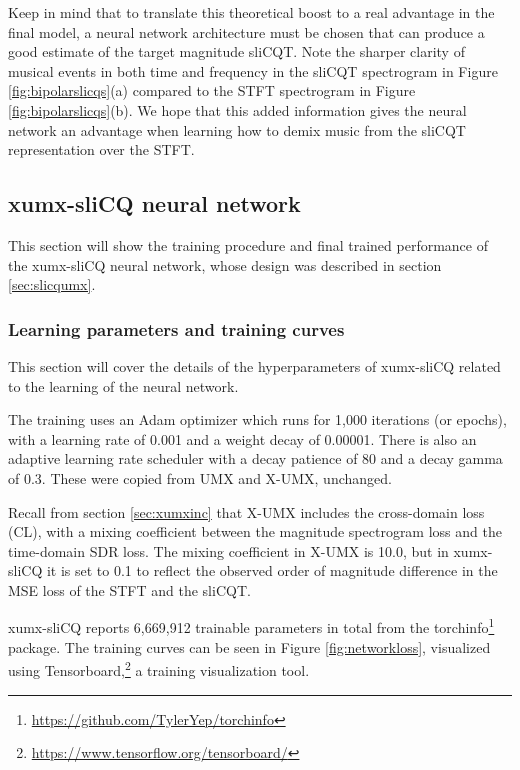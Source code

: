 \documentclass[report.tex]{subfiles}
\begin{document}
Keep in mind that to translate this theoretical boost to a real advantage in the final model, a neural network architecture must be chosen that can produce a good estimate of the target magnitude sliCQT. Note the sharper clarity of musical events in both time and frequency in the sliCQT spectrogram in Figure \ref{fig:bipolarslicqs}(a) compared to the STFT spectrogram in Figure \ref{fig:bipolarslicqs}(b). We hope that this added information gives the neural network an advantage when learning how to demix music from the sliCQT representation over the STFT.

\newpagefill

\subsection{xumx-sliCQ neural network}

This section will show the training procedure and final trained performance of the xumx-sliCQ neural network, whose design was described in section \ref{sec:slicqumx}.

\subsubsection{Learning parameters and training curves}

This section will cover the details of the hyperparameters of xumx-sliCQ related to the learning of the neural network.

The training uses an Adam optimizer which runs for 1,000 iterations (or epochs), with a learning rate of 0.001 and a weight decay of 0.00001. There is also an adaptive learning rate scheduler with a decay patience of 80 and a decay gamma of 0.3. These were copied from UMX and X-UMX, unchanged.

Recall from section \ref{sec:xumxinc} that X-UMX includes the cross-domain loss (CL), with a mixing coefficient between the magnitude spectrogram loss and the time-domain SDR loss. The mixing coefficient in X-UMX is 10.0, but in xumx-sliCQ it is set to 0.1 to reflect the observed order of magnitude difference in the MSE loss of the STFT and the sliCQT.

xumx-sliCQ reports 6,669,912 trainable parameters in total from the torchinfo\footnote{\url{https://github.com/TylerYep/torchinfo}} package. The training curves can be seen in Figure \ref{fig:networkloss}, visualized using Tensorboard,\footnote{\url{https://www.tensorflow.org/tensorboard/}} a training visualization tool.
\end{document}
